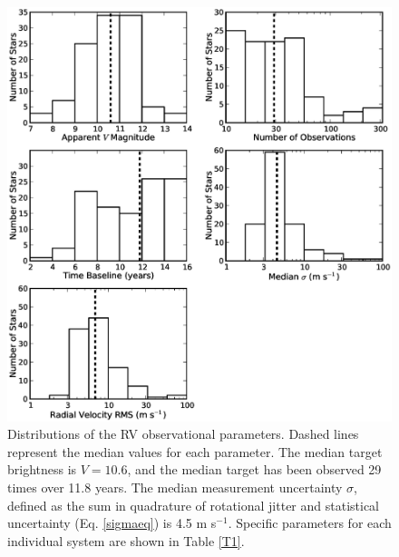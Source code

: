 \begin{figure}[htbp]
\centerline{\includegraphics[width=1.0\textwidth]{chapter3/f1.eps}}
\caption[Summary statistics of RV observations]{Distributions of the RV observational parameters. Dashed lines represent the median values for each parameter. The median target brightness is $V = 10.6$, and the median target has been observed 29 times over 11.8 years. The median measurement uncertainty $\sigma$, defined as the sum in quadrature of rotational jitter and statistical uncertainty (Eq. \ref{sigmaeq}) is 4.5 m s$^{-1}$. Specific parameters for each individual system are shown in Table \ref{T1}.
  }
\label{Hists}
\end{figure}


